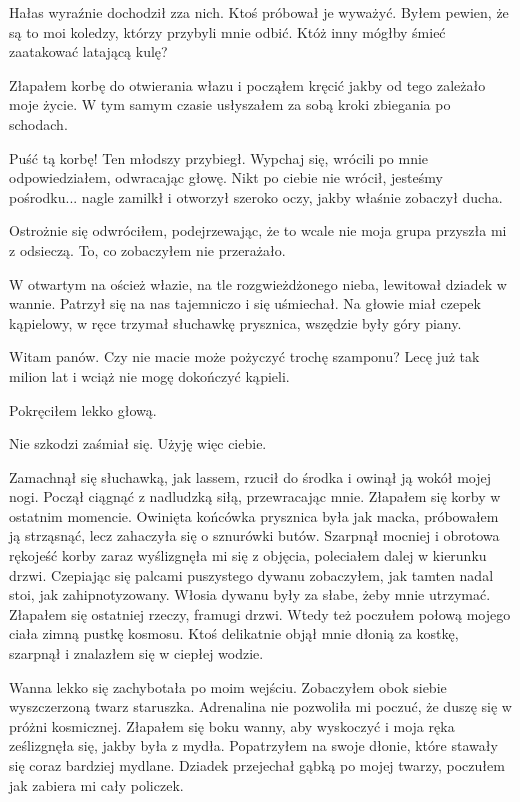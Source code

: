 Hałas wyraźnie dochodził zza nich. Ktoś próbował je wyważyć.
Byłem pewien, że są to moi koledzy, którzy przybyli mnie odbić.
Któż inny mógłby śmieć zaatakować latającą kulę?

Złapałem korbę do otwierania włazu i począłem kręcić jakby od tego zależało moje życie.
W tym samym czasie usłyszałem za sobą kroki zbiegania po schodach.
\begin{dialogue}
\ds{} Puść tą korbę! \dm{} Ten młodszy przybiegł.
\ds{} Wypchaj się, wrócili po mnie \dm{} odpowiedziałem, odwracając głowę.
\ds{} Nikt po ciebie nie wrócił, jesteśmy pośrodku... \dm{} nagle zamilkł i otworzył szeroko oczy, jakby właśnie zobaczył ducha.
\end{dialogue}
Ostrożnie się odwróciłem, podejrzewając, że to wcale nie moja grupa przyszła mi z odsieczą.
To, co zobaczyłem nie przerażało.

W otwartym na oścież włazie, na tle rozgwieżdżonego nieba, lewitował dziadek w wannie.
Patrzył się na nas tajemniczo i się uśmiechał. Na głowie miał czepek kąpielowy, w ręce trzymał słuchawkę prysznica, wszędzie były góry piany.
\begin{dialogue}
\ds{} Witam panów. Czy nie macie może pożyczyć trochę szamponu? Lecę już tak milion lat i wciąż nie mogę dokończyć kąpieli.
\end{dialogue}
Pokręciłem lekko głową.
\begin{dialogue}
\ds{} Nie szkodzi \dm{} zaśmiał się. \dm{} Użyję więc ciebie.
\end{dialogue}
Zamachnął się słuchawką, jak lassem, rzucił do środka i owinął ją wokół mojej nogi.
Począł ciągnąć z nadludzką siłą, przewracając mnie. Złapałem się korby w ostatnim momencie.
Owinięta końcówka prysznica była jak macka, próbowałem ją strząsnąć, lecz zahaczyła się o sznurówki butów.
Szarpnął mocniej i obrotowa rękojeść korby zaraz wyślizgnęła mi się z objęcia, poleciałem dalej w kierunku drzwi.
Czepiając się palcami puszystego dywanu zobaczyłem, jak tamten nadal stoi, jak zahipnotyzowany.
Włosia dywanu były za słabe, żeby mnie utrzymać. Złapałem się ostatniej rzeczy, framugi drzwi.
Wtedy też poczułem połową mojego ciała zimną pustkę kosmosu.
Ktoś delikatnie objął mnie dłonią za kostkę, szarpnął i znalazłem się w ciepłej wodzie.

Wanna lekko się zachybotała po moim wejściu.
Zobaczyłem obok siebie wyszczerzoną twarz staruszka.
Adrenalina nie pozwoliła mi poczuć, że duszę się w próżni kosmicznej.
Złapałem się boku wanny, aby wyskoczyć i moja ręka ześlizgnęła się, jakby była z mydła.
Popatrzyłem na swoje dłonie, które stawały się coraz bardziej mydlane.
Dziadek przejechał gąbką po mojej twarzy, poczułem jak zabiera mi cały policzek.

